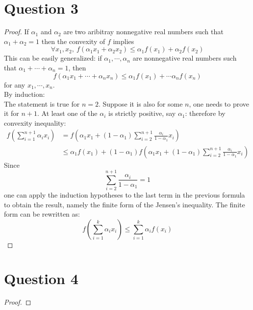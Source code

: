 \documentclass{article}
\begin{document}
\section*{Question 3}
    \begin{proof}
        If $\alpha_1$ and $\alpha_2$ are two aribitray nonnegative real numbers such that $\alpha_1+\alpha_2=1$ then
        the convexity of $f$ implies
        $$ \forall x_1, x_2, \ f(\alpha_1 x_1 + \alpha_2 x_2) \leqslant \alpha_1 f(x_1) + \alpha_2 f(x_2) $$
        This can be easily generalized: if $\alpha_1, \cdots, \alpha_n$ are nonnegative real numbers such that
        $\alpha_1 + \cdots + \alpha_n = 1$, then
        $$f(\alpha_1 x_1 + \cdots + \alpha_n x_n) \leqslant \alpha_1 f(x_1) + \cdots \alpha_n f(x_n)$$
        for any $x_1, \cdots, x_n$.\\
        By induction:\\
        The statement is true for $n=2$. Suppose it is also for some $n$, one needs to prove it for $n+1$.
        At least one of the $\alpha_i$ is strictly positive, say $\alpha_1$: therefore by convexity inequality:
        \begin{align*}
            f\left(\sum_{i=1}^{n+1}\alpha_i x_i\right) &= f\left(\alpha_1 x_1 + (1-\alpha_1)\sum_{i=2}^{n+1}\frac{\alpha_i}{1-\alpha_1}x_i\right)\\
            &\leqslant \alpha_1 f(x_1) + (1-\alpha_1) f\left(\alpha_1 x_1 + (1-\alpha_1)\sum_{i=2}^{n+1}\frac{\alpha_i}{1-\alpha_1}x_i\right)
        \end{align*}
        Since $$ \sum_{i=2}^{n+1}\frac{\alpha_i}{1-\alpha_1} = 1 $$
        one can apply the induction hypotheses to the last term in the previous formula to obtain the result, namely the finite form of the Jensen's inequality.
        The finite form can be rewritten as:
        $$f\left(\sum_{i=1}^k \alpha_i x_i\right) \leqslant \sum_{i=1}^k \alpha_i f(x_i)$$
    \end{proof}

\section*{Question 4}
    \begin{proof}
        
    \end{proof}
\end{document}
